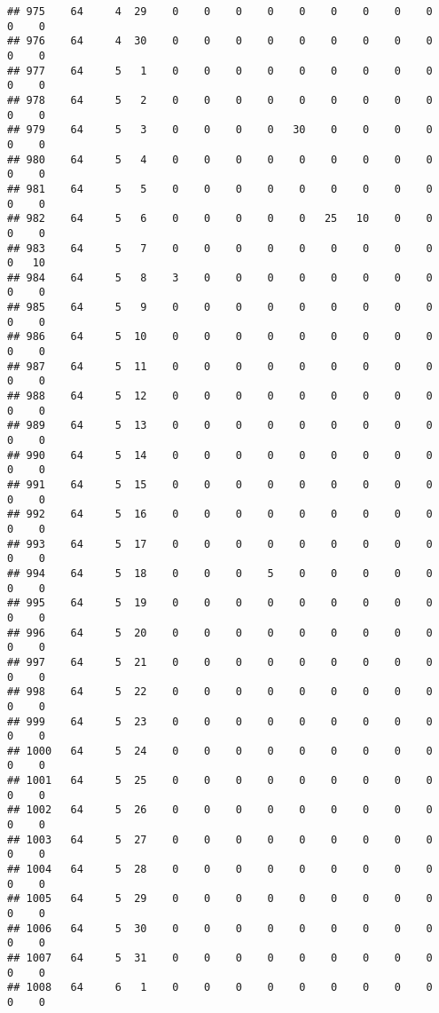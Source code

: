 \documentclass[]{article}
\begin{document}
\begin{verbatim}
## 975    64     4  29    0    0    0    0    0    0    0    0    0    0    0
## 976    64     4  30    0    0    0    0    0    0    0    0    0    0    0
## 977    64     5   1    0    0    0    0    0    0    0    0    0    0    0
## 978    64     5   2    0    0    0    0    0    0    0    0    0    0    0
## 979    64     5   3    0    0    0    0   30    0    0    0    0    0    0
## 980    64     5   4    0    0    0    0    0    0    0    0    0    0    0
## 981    64     5   5    0    0    0    0    0    0    0    0    0    0    0
## 982    64     5   6    0    0    0    0    0   25   10    0    0    0    0
## 983    64     5   7    0    0    0    0    0    0    0    0    0    0   10
## 984    64     5   8    3    0    0    0    0    0    0    0    0    0    0
## 985    64     5   9    0    0    0    0    0    0    0    0    0    0    0
## 986    64     5  10    0    0    0    0    0    0    0    0    0    0    0
## 987    64     5  11    0    0    0    0    0    0    0    0    0    0    0
## 988    64     5  12    0    0    0    0    0    0    0    0    0    0    0
## 989    64     5  13    0    0    0    0    0    0    0    0    0    0    0
## 990    64     5  14    0    0    0    0    0    0    0    0    0    0    0
## 991    64     5  15    0    0    0    0    0    0    0    0    0    0    0
## 992    64     5  16    0    0    0    0    0    0    0    0    0    0    0
## 993    64     5  17    0    0    0    0    0    0    0    0    0    0    0
## 994    64     5  18    0    0    0    5    0    0    0    0    0    0    0
## 995    64     5  19    0    0    0    0    0    0    0    0    0    0    0
## 996    64     5  20    0    0    0    0    0    0    0    0    0    0    0
## 997    64     5  21    0    0    0    0    0    0    0    0    0    0    0
## 998    64     5  22    0    0    0    0    0    0    0    0    0    0    0
## 999    64     5  23    0    0    0    0    0    0    0    0    0    0    0
## 1000   64     5  24    0    0    0    0    0    0    0    0    0    0    0
## 1001   64     5  25    0    0    0    0    0    0    0    0    0    0    0
## 1002   64     5  26    0    0    0    0    0    0    0    0    0    0    0
## 1003   64     5  27    0    0    0    0    0    0    0    0    0    0    0
## 1004   64     5  28    0    0    0    0    0    0    0    0    0    0    0
## 1005   64     5  29    0    0    0    0    0    0    0    0    0    0    0
## 1006   64     5  30    0    0    0    0    0    0    0    0    0    0    0
## 1007   64     5  31    0    0    0    0    0    0    0    0    0    0    0
## 1008   64     6   1    0    0    0    0    0    0    0    0    0    0    0

\end{verbatim}
\end{document}
